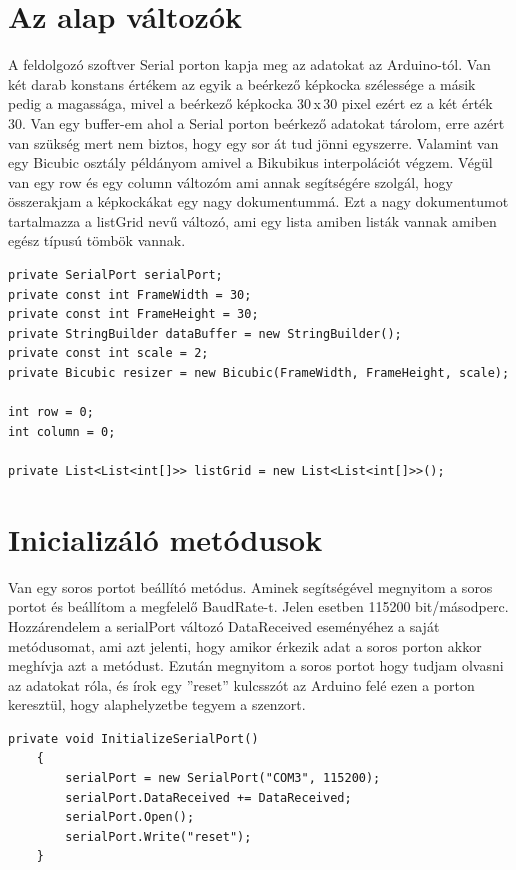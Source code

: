 \documentclass[]{thesis-ekf}
\theoremstyle{definition}
\theoremstyle{remark}
\begin{document}
\section{Az alap változók}
A feldolgozó szoftver Serial porton kapja meg az adatokat az Arduino-tól. Van két darab konstans értékem az egyik a beérkező képkocka szélessége a másik pedig a magassága, mivel a beérkező képkocka 30\,x\,30 pixel ezért ez a két érték 30. Van egy buffer-em ahol a Serial porton beérkező adatokat tárolom, erre azért van szükség mert nem biztos, hogy egy sor át tud jönni egyszerre. Valamint van egy Bicubic osztály példányom amivel a Bikubikus interpolációt végzem. Végül van egy row és egy column változóm ami annak segítségére szolgál, hogy összerakjam a képkockákat egy nagy dokumentummá. Ezt a nagy dokumentumot tartalmazza a listGrid nevű változó, ami egy lista amiben listák vannak amiben egész típusú tömbök vannak. 
\begin{lstlisting}[language=CSharp]
private SerialPort serialPort;
private const int FrameWidth = 30; 
private const int FrameHeight = 30; 
private StringBuilder dataBuffer = new StringBuilder(); 
private const int scale = 2;
private Bicubic resizer = new Bicubic(FrameWidth, FrameHeight, scale);

int row = 0;
int column = 0;

private List<List<int[]>> listGrid = new List<List<int[]>>();
\end{lstlisting}

\section{Inicializáló metódusok}
Van egy soros portot beállító metódus. Aminek segítségével megnyitom a soros portot és beállítom a megfelelő BaudRate-t. Jelen esetben 115200 bit/másodperc. Hozzárendelem a serialPort változó DataReceived eseményéhez a saját metódusomat, ami azt jelenti, hogy amikor érkezik adat a soros porton akkor meghívja azt a metódust. Ezután megnyitom a soros portot hogy tudjam olvasni az adatokat róla, és írok egy ''reset'' kulcsszót az Arduino felé ezen a porton keresztül, hogy alaphelyzetbe tegyem a szenzort.
\begin{lstlisting}[language=CSharp]
	private void InitializeSerialPort()
	{
		serialPort = new SerialPort("COM3", 115200);
		serialPort.DataReceived += DataReceived;
		serialPort.Open();
		serialPort.Write("reset");
	}
\end{lstlisting}
\end{document}
